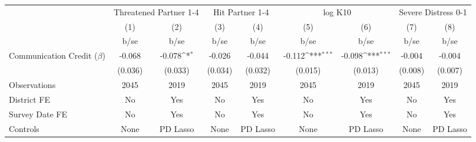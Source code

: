 {
\def\sym#1{\ifmmode^{#1}\else\(^{#1}\)\fi}
\begin{tabular}{l*{8}{c}}
\hline\hline
                                                  &\multicolumn{2}{c}{Threatened Partner 1-4} &\multicolumn{2}{c}{Hit Partner 1-4}        &\multicolumn{2}{c}{log K10}                &\multicolumn{2}{c}{Severe Distress 0-1}    \\\cmidrule(lr){2-3}\cmidrule(lr){4-5}\cmidrule(lr){6-7}\cmidrule(lr){8-9}
                                                  &\multicolumn{1}{c}{(1)}         &\multicolumn{1}{c}{(2)}         &\multicolumn{1}{c}{(3)}         &\multicolumn{1}{c}{(4)}         &\multicolumn{1}{c}{(5)}         &\multicolumn{1}{c}{(6)}         &\multicolumn{1}{c}{(7)}         &\multicolumn{1}{c}{(8)}         \\
                                                  &        b/se         &        b/se         &        b/se         &        b/se         &        b/se         &        b/se         &        b/se         &        b/se         \\
\hline
Communication Credit ($\beta$)                    &      -0.068         &      -0.078\sym{*}  &      -0.026         &      -0.044         &      -0.112\sym{***}&      -0.098\sym{***}&      -0.004         &      -0.004         \\
                                                  &     (0.036)         &     (0.033)         &     (0.034)         &     (0.032)         &     (0.015)         &     (0.013)         &     (0.008)         &     (0.007)         \\
\hline
Observations                                      &        2045         &        2019         &        2045         &        2019         &        2045         &        2019         &        2045         &        2019         \\
District FE                                       &          No         &         Yes         &          No         &         Yes         &          No         &         Yes         &          No         &         Yes         \\
Survey Date FE                                    &          No         &         Yes         &          No         &         Yes         &          No         &         Yes         &          No         &         Yes         \\
Controls                                          &        None         &    PD Lasso         &        None         &    PD Lasso         &        None         &    PD Lasso         &        None         &    PD Lasso         \\

\end{tabular}}
